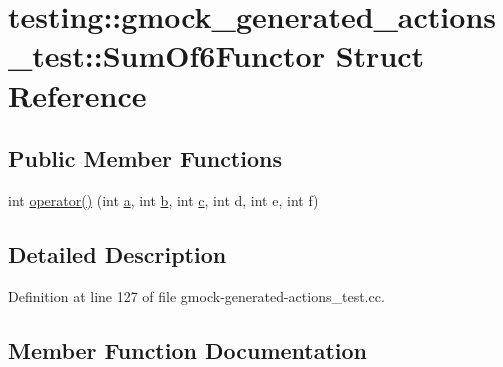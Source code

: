 \hypertarget{structtesting_1_1gmock__generated__actions__test_1_1_sum_of6_functor}{}\section{testing\+:\+:gmock\+\_\+generated\+\_\+actions\+\_\+test\+:\+:Sum\+Of6\+Functor Struct Reference}
\label{structtesting_1_1gmock__generated__actions__test_1_1_sum_of6_functor}
\subsection*{Public Member Functions}
\begin{DoxyCompactItemize}
\item 
int \hyperlink{structtesting_1_1gmock__generated__actions__test_1_1_sum_of6_functor_adb500f7bdfa5a5887623fa38cd805e41}{operator()} (int \hyperlink{_07copy_08_2_read_camera_model_8m_a551a3d351eadcc0b9b1a2f24f0fb5ea0}{a}, int \hyperlink{jquery_8js_a2fa551895933fae935a0a6b87282241d}{b}, int \hyperlink{jquery_8js_abce695e0af988ece0826d9ad59b8160d}{c}, int d, int e, int f)
\end{DoxyCompactItemize}


\subsection{Detailed Description}


Definition at line 127 of file gmock-\/generated-\/actions\+\_\+test.\+cc.



\subsection{Member Function Documentation}

